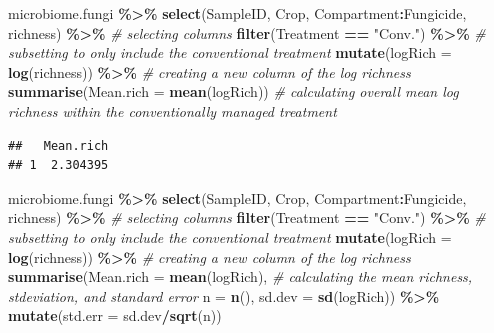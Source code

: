 \documentclass[
]{article}
\newenvironment{Shaded}{\begin{snugshade}}{\end{snugshade}}
\newcommand{\AttributeTok}[1]{\textcolor[rgb]{0.13,0.29,0.53}{#1}}
\newcommand{\CommentTok}[1]{\textcolor[rgb]{0.56,0.35,0.01}{\textit{#1}}}
\newcommand{\FunctionTok}[1]{\textcolor[rgb]{0.13,0.29,0.53}{\textbf{#1}}}
\newcommand{\NormalTok}[1]{#1}
\newcommand{\SpecialCharTok}[1]{\textcolor[rgb]{0.81,0.36,0.00}{\textbf{#1}}}
\newcommand{\StringTok}[1]{\textcolor[rgb]{0.31,0.60,0.02}{#1}}
\begin{document}
\begin{Shaded}
\begin{Highlighting}[]
\NormalTok{microbiome.fungi }\SpecialCharTok{\%\textgreater{}\%}
  \FunctionTok{select}\NormalTok{(SampleID, Crop, Compartment}\SpecialCharTok{:}\NormalTok{Fungicide, richness) }\SpecialCharTok{\%\textgreater{}\%} \CommentTok{\# selecting columns}
  \FunctionTok{filter}\NormalTok{(Treatment }\SpecialCharTok{==} \StringTok{"Conv."}\NormalTok{) }\SpecialCharTok{\%\textgreater{}\%} \CommentTok{\# subsetting to only include the conventional treatment}
  \FunctionTok{mutate}\NormalTok{(}\AttributeTok{logRich =} \FunctionTok{log}\NormalTok{(richness)) }\SpecialCharTok{\%\textgreater{}\%} \CommentTok{\# creating a new column of the log richness}
  \FunctionTok{summarise}\NormalTok{(}\AttributeTok{Mean.rich =} \FunctionTok{mean}\NormalTok{(logRich)) }\CommentTok{\# calculating overall mean log richness within the conventionally managed treatment}
\end{Highlighting}
\end{Shaded}

\begin{verbatim}
##   Mean.rich
## 1  2.304395
\end{verbatim}

\begin{Shaded}
\begin{Highlighting}[]
\NormalTok{microbiome.fungi }\SpecialCharTok{\%\textgreater{}\%}
  \FunctionTok{select}\NormalTok{(SampleID, Crop, Compartment}\SpecialCharTok{:}\NormalTok{Fungicide, richness) }\SpecialCharTok{\%\textgreater{}\%} \CommentTok{\# selecting columns}
  \FunctionTok{filter}\NormalTok{(Treatment }\SpecialCharTok{==} \StringTok{"Conv."}\NormalTok{) }\SpecialCharTok{\%\textgreater{}\%} \CommentTok{\# subsetting to only include the conventional treatment}
  \FunctionTok{mutate}\NormalTok{(}\AttributeTok{logRich =} \FunctionTok{log}\NormalTok{(richness)) }\SpecialCharTok{\%\textgreater{}\%} \CommentTok{\# creating a new column of the log richness}
  \FunctionTok{summarise}\NormalTok{(}\AttributeTok{Mean.rich =} \FunctionTok{mean}\NormalTok{(logRich), }\CommentTok{\# calculating the mean richness, stdeviation, and standard error}
            \AttributeTok{n =} \FunctionTok{n}\NormalTok{(), }
            \AttributeTok{sd.dev =} \FunctionTok{sd}\NormalTok{(logRich)) }\SpecialCharTok{\%\textgreater{}\%}
  \FunctionTok{mutate}\NormalTok{(}\AttributeTok{std.err =}\NormalTok{ sd.dev}\SpecialCharTok{/}\FunctionTok{sqrt}\NormalTok{(n))}
\end{Highlighting}
\end{Shaded}
\end{document}
